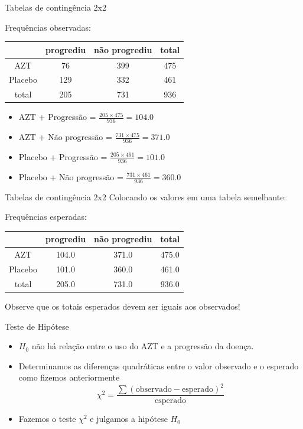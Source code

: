 \documentclass{beamer}
\begin{document}
\begin{frame}{Tabelas de contingência 2x2}
  \begin{example}
    Frequências observadas:
    \begin{tabular}{c|c|c|c}
      & progrediu & não progrediu & total\\
      \hline
      AZT & 76 & 399 & 475\\
      \hline
      Placebo & 129 & 332 & 461\\
      \hline
      total & 205 & 731 & 936\\
    \end{tabular}
  \end{example}
  \begin{itemize}
  \item AZT + Progressão = $\frac{205 \times 475}{936} = 104.0$
  \item AZT + Não progressão = $\frac{731 \times 475}{936} = 371.0$
  \item Placebo + Progressão = $\frac{205 \times 461}{936} = 101.0$
  \item Placebo + Não progressão = $\frac{731 \times 461}{936} = 360.0$
  \end{itemize}
\end{frame}



\begin{frame}{Tabelas de contingência 2x2}
Colocando os valores em uma tabela semelhante:
  \begin{example}
    Frequências esperadas:
    \begin{tabular}{c|c|c|c}
      & progrediu & não progrediu & total\\
      \hline
      AZT & 104.0 & 371.0 & 475.0\\
      \hline
      Placebo & 101.0 & 360.0 & 461.0\\
      \hline
      total & 205.0 & 731.0 & 936.0\\
    \end{tabular}
  \end{example}
Observe que os totais esperados devem ser iguais aos observados!
\end{frame}

\begin{frame}{Teste de Hipótese}
  \begin{itemize}
  \item $H_0$ não há relação entre o uso do AZT e a progressão da doença.
  \item Determinamos as diferenças quadráticas entre o valor observado
    e o esperado como fizemos anteriormente
    \begin{displaymath}
      \chi^2 = \frac{\sum (\text{observado} - \text{esperado})^2 }{\text{esperado}}
    \end{displaymath}
  \item Fazemos o teste $\chi^2$ e julgamos a hipótese $H_0$
  \end{itemize}
\end{frame}
\end{document}
